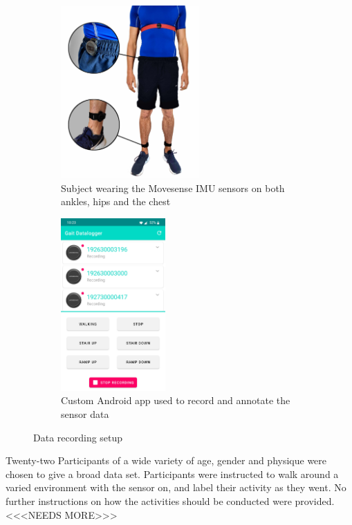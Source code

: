 \documentclass[sensors,article,submit,moreauthors,pdftex]{Definitions/mdpi}
\begin{document}
\begin{figure}[!hbt]
     \begin{subfigure}[b]{0.49\textwidth}
         \centering
         \includegraphics[height=250px]{Figures/movesense/sensor_locations.jpg}
         \captionsetup{justification=centering}
         \caption{Subject wearing the Movesense IMU sensors on both ankles, hips and the chest}
         \label{subfig:movesense_sensors}
     \end{subfigure}
     \hfill
     \begin{subfigure}[b]{0.49\textwidth}
         \centering
         \includegraphics[height=250px]{Figures/movesense/app_recording_short.jpg}
         \captionsetup{justification=centering}
         \caption{Custom Android app used to record and annotate the sensor data}
         \label{subfig:android_app}
     \end{subfigure}
    \caption{Data recording setup}
    \label{fig:imu_sensors and app}
\end{figure}

Twenty-two Participants of a wide variety of age, gender and physique were chosen to give a broad data set. Participants were instructed to walk around a varied environment with the sensor on, and label their activity as they went. No further instructions on how the activities should be conducted were provided. <<<NEEDS MORE>>>
\end{document}
